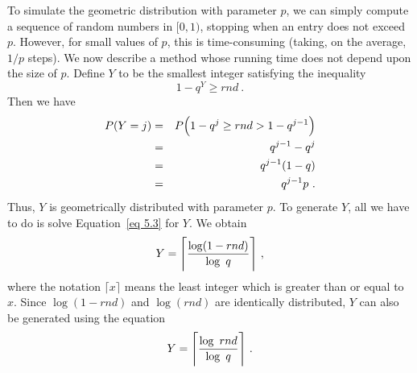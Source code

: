 \par To simulate the geometric distribution with parameter $p$, we can simply compute
a sequence of random numbers in $[0, 1)$, stopping when an entry does not exceed $p$. 
However, for small values of
$p$, this is time-consuming (taking, on the average, $1/p$ steps).  We now describe a
method whose running time does not depend upon the size of $p$.  Define $Y$ to be the smallest integer
satisfying the inequality
\begin{equation}
1 - q^Y \ge rnd\ .\label{eq 5.3}
\end{equation} 
Then we have
\begin{eqnarray*} P(Y = j) & = & P\Bigl(1 - q^j \ge rnd > 1 - q^{j-1}\Bigr) \\ & = &
q^{j-1} - q^j \\ & = & q^{j-1}(1-q) \\ & = & q^{j-1}p\ . \\
\end{eqnarray*} Thus, $Y$ is geometrically distributed with parameter $p$.  To
generate $Y$, all we have to do is solve Equation~\ref{eq 5.3} for $Y$.  We obtain
$$Y = \Biggl\lceil {{\log(1-rnd)}\over{\log\ q}}\Biggr\rceil\ ,$$
where the notation $\lceil x \rceil$ means the least integer which is greater than or equal to $x$.
 Since $\log(1-rnd)$ and
$\log(rnd)$ are identically distributed, $Y$ can also be generated using the equation
$$Y = \Biggl\lceil {{\log\ rnd}\over{\log\ q}}\Biggr\rceil\ .$$

